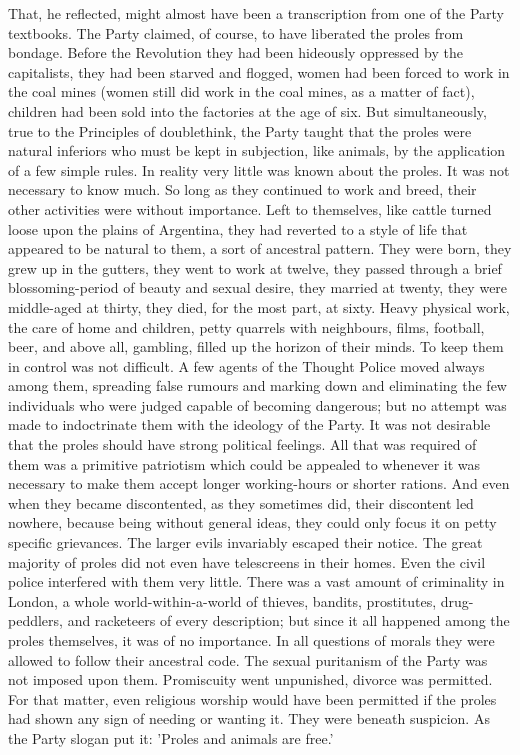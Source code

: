 \documentclass{article}
\begin{document}
That, he reflected, might almost have been a transcription from one of the
Party textbooks. The Party claimed, of course, to have liberated the proles
from bondage. Before the Revolution they had been hideously oppressed by
the capitalists, they had been starved and flogged, women had been forced
to work in the coal mines (women still did work in the coal mines, as a
matter of fact), children had been sold into the factories at the age
of six. But simultaneously, true to the Principles of doublethink, the
Party taught that the proles were natural inferiors who must be kept in
subjection, like animals, by the application of a few simple rules. In
reality very little was known about the proles. It was not necessary to
know much. So long as they continued to work and breed, their other
activities were without importance. Left to themselves, like cattle turned
loose upon the plains of Argentina, they had reverted to a style of life
that appeared to be natural to them, a sort of ancestral pattern. They were
born, they grew up in the gutters, they went to work at twelve, they passed
through a brief blossoming-period of beauty and sexual desire, they married
at twenty, they were middle-aged at thirty, they died, for the most part,
at sixty. Heavy physical work, the care of home and children, petty
quarrels with neighbours, films, football, beer, and above all, gambling,
filled up the horizon of their minds. To keep them in control was not
difficult. A few agents of the Thought Police moved always among them,
spreading false rumours and marking down and eliminating the few
individuals who were judged capable of becoming dangerous; but no attempt
was made to indoctrinate them with the ideology of the Party. It was not
desirable that the proles should have strong political feelings. All that
was required of them was a primitive patriotism which could be appealed to
whenever it was necessary to make them accept longer working-hours or
shorter rations. And even when they became discontented, as they sometimes
did, their discontent led nowhere, because being without general ideas,
they could only focus it on petty specific grievances. The larger evils
invariably escaped their notice. The great majority of proles did not even
have telescreens in their homes. Even the civil police interfered with them
very little. There was a vast amount of criminality in London, a whole
world-within-a-world of thieves, bandits, prostitutes, drug-peddlers, and
racketeers of every description; but since it all happened among the proles
themselves, it was of no importance. In all questions of morals they were
allowed to follow their ancestral code. The sexual puritanism of the
Party was not imposed upon them. Promiscuity went unpunished, divorce
was permitted. For that matter, even religious worship would have been
permitted if the proles had shown any sign of needing or wanting it.
They were beneath suspicion. As the Party slogan put it: 'Proles and
animals are free.'
\end{document}
